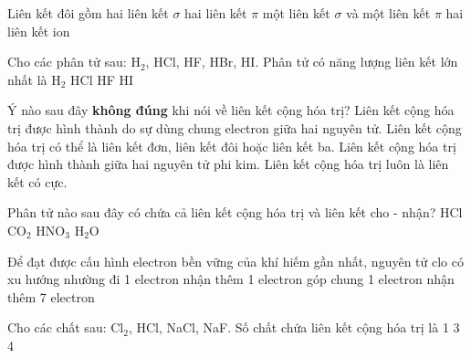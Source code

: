 \begin{ex}
Liên kết đôi gồm
\choice
{hai liên kết $\sigma$}
{hai liên kết $\pi$}
{\True một liên kết $\sigma$ và một liên kết $\pi$}
{hai liên kết ion}
\end{ex}

\begin{ex}
Cho các phân tử sau: H$_2$, HCl, HF, HBr, HI. Phân tử có năng lượng liên kết lớn nhất là
\choice
{H$_2$}
{HCl}
{\True HF}
{HI}
\end{ex}

\begin{ex}
Ý nào sau đây \textbf{không đúng} khi nói về liên kết cộng hóa trị?
\choice
{Liên kết cộng hóa trị được hình thành do sự dùng chung electron giữa hai nguyên tử.}
{Liên kết cộng hóa trị có thể là liên kết đơn, liên kết đôi hoặc liên kết ba.}
{Liên kết cộng hóa trị được hình thành giữa hai nguyên tử phi kim.}
{\True Liên kết cộng hóa trị luôn là liên kết có cực.}
\end{ex}

\begin{ex}
Phân tử nào sau đây có chứa cả liên kết cộng hóa trị và liên kết cho - nhận?
\choice
{HCl}
{CO$_2$}
{\True HNO$_3$}
{H$_2$O}
\end{ex}

\begin{ex}
Để đạt được cấu hình electron bền vững của khí hiếm gần nhất, nguyên tử clo có xu hướng
\choice
{nhường đi 1 electron}
{\True nhận thêm 1 electron}
{góp chung 1 electron}
{nhận thêm 7 electron}
\end{ex}

\begin{ex}
Cho các chất sau: Cl$_2$, HCl, NaCl, NaF.  Số chất chứa liên kết cộng hóa trị là
\choice
{1}
{}
{3}
{4}
\end{ex}